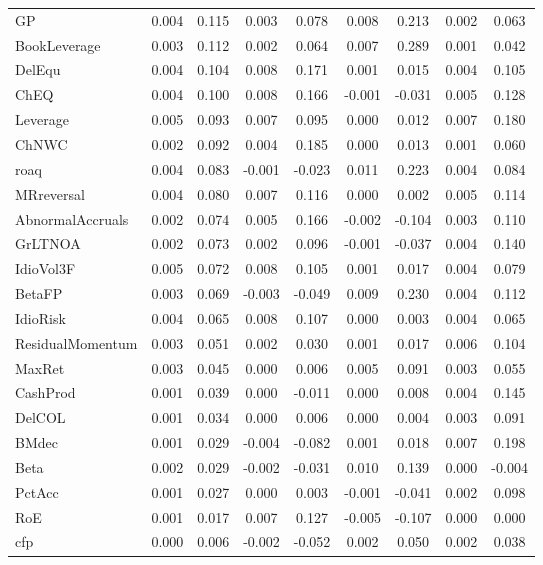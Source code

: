 \begin{table}[H]
\begin{tabular}{lcc|cc|cc|cc}
      GP & 0.004 & 0.115 & 0.003 & 0.078 & 0.008 & 0.213 & 0.002 & 0.063 \\ 
      BookLeverage & 0.003 & 0.112 & 0.002 & 0.064 & 0.007 & 0.289 & 0.001 & 0.042 \\ 
      DelEqu & 0.004 & 0.104 & 0.008 & 0.171 & 0.001 & 0.015 & 0.004 & 0.105 \\ 
      ChEQ & 0.004 & 0.100 & 0.008 & 0.166 & -0.001 & -0.031 & 0.005 & 0.128 \\ 
      Leverage & 0.005 & 0.093 & 0.007 & 0.095 & 0.000 & 0.012 & 0.007 & 0.180 \\ 
      ChNWC & 0.002 & 0.092 & 0.004 & 0.185 & 0.000 & 0.013 & 0.001 & 0.060 \\ 
      roaq & 0.004 & 0.083 & -0.001 & -0.023 & 0.011 & 0.223 & 0.004 & 0.084 \\ 
      MRreversal & 0.004 & 0.080 & 0.007 & 0.116 & 0.000 & 0.002 & 0.005 & 0.114 \\ 
      AbnormalAccruals & 0.002 & 0.074 & 0.005 & 0.166 & -0.002 & -0.104 & 0.003 & 0.110 \\ 
      GrLTNOA & 0.002 & 0.073 & 0.002 & 0.096 & -0.001 & -0.037 & 0.004 & 0.140 \\ 
      IdioVol3F & 0.005 & 0.072 & 0.008 & 0.105 & 0.001 & 0.017 & 0.004 & 0.079 \\ 
      BetaFP & 0.003 & 0.069 & -0.003 & -0.049 & 0.009 & 0.230 & 0.004 & 0.112 \\ 
      IdioRisk & 0.004 & 0.065 & 0.008 & 0.107 & 0.000 & 0.003 & 0.004 & 0.065 \\ 
      ResidualMomentum & 0.003 & 0.051 & 0.002 & 0.030 & 0.001 & 0.017 & 0.006 & 0.104 \\ 
      MaxRet & 0.003 & 0.045 & 0.000 & 0.006 & 0.005 & 0.091 & 0.003 & 0.055 \\ 
      CashProd & 0.001 & 0.039 & 0.000 & -0.011 & 0.000 & 0.008 & 0.004 & 0.145 \\ 
      DelCOL & 0.001 & 0.034 & 0.000 & 0.006 & 0.000 & 0.004 & 0.003 & 0.091 \\ 
      BMdec & 0.001 & 0.029 & -0.004 & -0.082 & 0.001 & 0.018 & 0.007 & 0.198 \\ 
      Beta & 0.002 & 0.029 & -0.002 & -0.031 & 0.010 & 0.139 & 0.000 & -0.004 \\ 
      PctAcc & 0.001 & 0.027 & 0.000 & 0.003 & -0.001 & -0.041 & 0.002 & 0.098 \\ 
      RoE & 0.001 & 0.017 & 0.007 & 0.127 & -0.005 & -0.107 & 0.000 & 0.000 \\ 
      cfp & 0.000 & 0.006 & -0.002 & -0.052 & 0.002 & 0.050 & 0.002 & 0.038 \\ 

\end{tabular}
\end{table}
